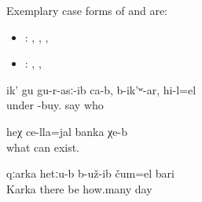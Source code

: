 Exemplary case forms of  and  are:
%
\begin{itemize}
	\item	{}:  ,  ,  ,  
	\item	{}:  ,  ,  
\end{itemize}
%
\begin{exe}
	\ex	\label{ex:Someone bought it down (= the area around the village of Sanzhi), they say}
	\gll	ik'	gu	gu-r-asː-ib ca-b,	b-ik'ʷ-ar,	hi-l=el\\
			under	-buy. 	say	who\\
	\glt	{}

	\ex	\label{ex:There down is a can of something}
	\gll	heχ	ce-lla=jal	banka	χe-b\\
			what	can	exist.\\
	\glt	{}

	\ex	\label{ex:In Karka the bandits stayed for some days.}
	\gll	qːarka	hetːu-b	b-už-ib	čum=el	bari\\
		Karka	there	be	how.many	day\\
	\glt	{}
\end{exe}

